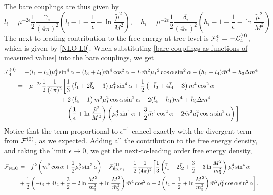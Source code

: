 The bare couplings are thus given by
\begin{equation}
    \label{bare couplings as functions of measured values}
    l_i = \mu^{-2\epsilon} \frac{1}{2} \frac{\gamma_i}{(4 \pi)^2}
    \left(
        \bar l_i -1- \frac{1}{\epsilon} - \ln\frac{\tilde \mu^2}{M^2}
    \right), 
    \quad
    h_i = \mu^{-2\epsilon} \frac{1}{2} \frac{\delta_i}{(4 \pi)^2}
    \left(
        \bar h_i - 1 - \frac{1}{\epsilon} - \ln\frac{\tilde \mu^2}{M^2}
    \right)
\end{equation}
The next-to-leading contribution to the free energy at tree-level is $\mathcal{F}_4^{0} = - \mathcal{L}_4^{(0)}$, which is given by \cref{NLO-L0}.
When substituting \cref{bare couplings as functions of measured values} into the bare couplings, we get
\begin{align*}
    \mathcal{F}^{(0)}_4
    & = 
    - (l_1 + l_2)\mu_I^4 \sin^4{\alpha}
    - (l_3 + l_4)\bar m^4 \cos^2{\alpha}
    - l_4 \bar m^2 \mu_I{}^2 \cos{\alpha} \sin^2{\alpha}
    -(h_1- l_4) \bar m^4
    - h_3 \Delta m^4
    \\
    & = 
    - \mu^{-2 \epsilon} \frac{1}{2} \frac{1}{(4 \pi)^2}
    \bigg[
        \frac{1}{3}
        \left( 
            \bar l_1 + 2 \bar l_2 - 3
        \right) \mu_I^4 \sin^4 \alpha
        +
        \frac{1}{2}
        \left(
            - \bar l_3 + 4 \bar l_4 - 3
        \right) \bar m^4 \cos^2\alpha
        \\
        & \quad \quad \quad \quad \quad \quad \quad
        + 2 \left(\bar l_4 - 1\right)
        \bar m^2 \mu_I^2 \cos\alpha \sin^2 \alpha
        + 2 (\bar l_4 - \bar h_1) \bar m^4
        + \bar h_3 \Delta m^4
        \\
        & \quad \quad \quad \quad \quad \quad \quad
        - 
        \left(\frac{1}{\epsilon} + \ln \frac{\tilde \mu^2}{M^2}\right) 
        \left(
            \mu_I^4\sin^4\alpha + \frac{3}{2} \bar m^4 \cos^2 \alpha
            + 2 \bar m^2 \mu_I^2 \cos\alpha \sin^2 \alpha
        \right) 
    \bigg] 
\end{align*}
Notice that the term proportional to $\epsilon^{-1}$ cancel exactly with the divergent term from $\mathcal{F}^{(2)}$, as we expected.
Adding all the contribution to the free energy density, and taking the limit $\epsilon \rightarrow 0$, we get the next-to-leading order free energy density,
\begin{align}
    \nonumber
    \Ef_{\mathrm{NLO}} &=
    - f^2 \left(\bar m^2 \cos \alpha + \frac{1}{2}\mu_I^2 \sin^2 \alpha\right)
    + \Ef^{(1)}_{\mathrm{fin}, \pi_\pm}
    - \frac{1}{2}\frac{1}{(4 \pi)^2}
    \bigg[
        \frac{1}{3}
        \left( 
            \bar l_1 + 2 \bar l_2 + \frac{3}{2} + 3 \ln \frac{M^2}{m_3^2}
        \right) \mu_I^4 \sin^4 \alpha
        \\ %
        &
        +
        \frac{1}{2}
        \left(
            - \bar l_3 + 4 \bar l_4 + \frac{3}{2} + 2\ln \frac{M^2}{m_3^2}
            + \ln \frac{M^2}{\tilde m^2_2}
        \right) \bar m^4 \cos^2\alpha 
        + 2 \left(\bar l_4 - \frac{1}{2} + \ln \frac{M^2}{m_3^2}\right)
        \bar m^2 \mu_I^2 \cos\alpha \sin^2 \alpha
        \label{NLO free energy}
    \bigg].
\end{align}
